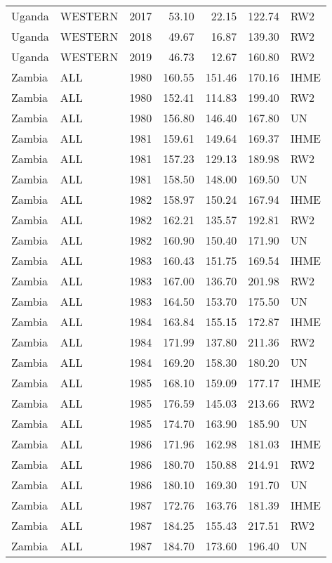 \begin{longtable}{lllrrrl}
  Uganda & WESTERN & 2017 & 53.10 & 22.15 & 122.74 & RW2 \\ 
  Uganda & WESTERN & 2018 & 49.67 & 16.87 & 139.30 & RW2 \\ 
  Uganda & WESTERN & 2019 & 46.73 & 12.67 & 160.80 & RW2 \\ 
  Zambia & ALL & 1980 & 160.55 & 151.46 & 170.16 & IHME \\ 
  Zambia & ALL & 1980 & 152.41 & 114.83 & 199.40 & RW2 \\ 
  Zambia & ALL & 1980 & 156.80 & 146.40 & 167.80 & UN \\ 
  Zambia & ALL & 1981 & 159.61 & 149.64 & 169.37 & IHME \\ 
  Zambia & ALL & 1981 & 157.23 & 129.13 & 189.98 & RW2 \\ 
  Zambia & ALL & 1981 & 158.50 & 148.00 & 169.50 & UN \\ 
  Zambia & ALL & 1982 & 158.97 & 150.24 & 167.94 & IHME \\ 
  Zambia & ALL & 1982 & 162.21 & 135.57 & 192.81 & RW2 \\ 
  Zambia & ALL & 1982 & 160.90 & 150.40 & 171.90 & UN \\ 
  Zambia & ALL & 1983 & 160.43 & 151.75 & 169.54 & IHME \\ 
  Zambia & ALL & 1983 & 167.00 & 136.70 & 201.98 & RW2 \\ 
  Zambia & ALL & 1983 & 164.50 & 153.70 & 175.50 & UN \\ 
  Zambia & ALL & 1984 & 163.84 & 155.15 & 172.87 & IHME \\ 
  Zambia & ALL & 1984 & 171.99 & 137.80 & 211.36 & RW2 \\ 
  Zambia & ALL & 1984 & 169.20 & 158.30 & 180.20 & UN \\ 
  Zambia & ALL & 1985 & 168.10 & 159.09 & 177.17 & IHME \\ 
  Zambia & ALL & 1985 & 176.59 & 145.03 & 213.66 & RW2 \\ 
  Zambia & ALL & 1985 & 174.70 & 163.90 & 185.90 & UN \\ 
  Zambia & ALL & 1986 & 171.96 & 162.98 & 181.03 & IHME \\ 
  Zambia & ALL & 1986 & 180.70 & 150.88 & 214.91 & RW2 \\ 
  Zambia & ALL & 1986 & 180.10 & 169.30 & 191.70 & UN \\ 
  Zambia & ALL & 1987 & 172.76 & 163.76 & 181.39 & IHME \\ 
  Zambia & ALL & 1987 & 184.25 & 155.43 & 217.51 & RW2 \\ 
  Zambia & ALL & 1987 & 184.70 & 173.60 & 196.40 & UN \\ 

\end{longtable}
